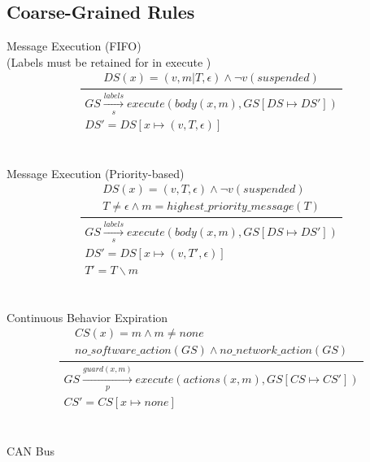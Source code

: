 \documentclass[]{article}
\begin{document}
\subsection{Coarse-Grained Rules} 
Message Execution (FIFO) \\
(Labels must be retained for in execute )
\begin{equation}
\frac
{
	\begin{gathered}
		DS(x)=(v,m|T,\epsilon) \wedge \neg v(suspended) 
	\end{gathered}
}
{
	\begin{gathered}
	GS\xrightarrow[s]{labels}execute(body(x,m),GS[DS\longmapsto DS'])  \\
	DS' = DS[x\longmapsto (v,T,\epsilon)]
	\end{gathered}
}
\end{equation}
\\\\
Message Execution (Priority-based)
\begin{equation}
\frac
{
	\begin{gathered}
	DS(x)=(v,T,\epsilon) \wedge \neg v(suspended) \\
	T \neq \epsilon \wedge m = highest\_priority\_message(T)
	\end{gathered}
}
{
	\begin{gathered}
	GS\xrightarrow[s]{labels}execute(body(x,m),GS[DS\longmapsto DS'])  \\
	DS' = DS[x\longmapsto (v,T',\epsilon)] \\
	T' = T \backslash m
	\end{gathered}
}
\end{equation}
\\\\
Continuous Behavior Expiration
\begin{equation}\label{ContinuousBehaviorExpiration}
\frac
{
	\begin{gathered}
	CS(x)=m \wedge m \neq none \\ 
	no\_software\_action(GS) \wedge no\_network\_action(GS)
	\end{gathered}
}
{
	\begin{gathered}
	GS \xrightarrow[p]{guard(x,m)} execute(actions(x,m),GS[CS\longmapsto CS']) \\
	CS'= CS[x\longmapsto none]
	\end{gathered}
}
\end{equation}
\\\\
CAN Bus 
\end{document}
